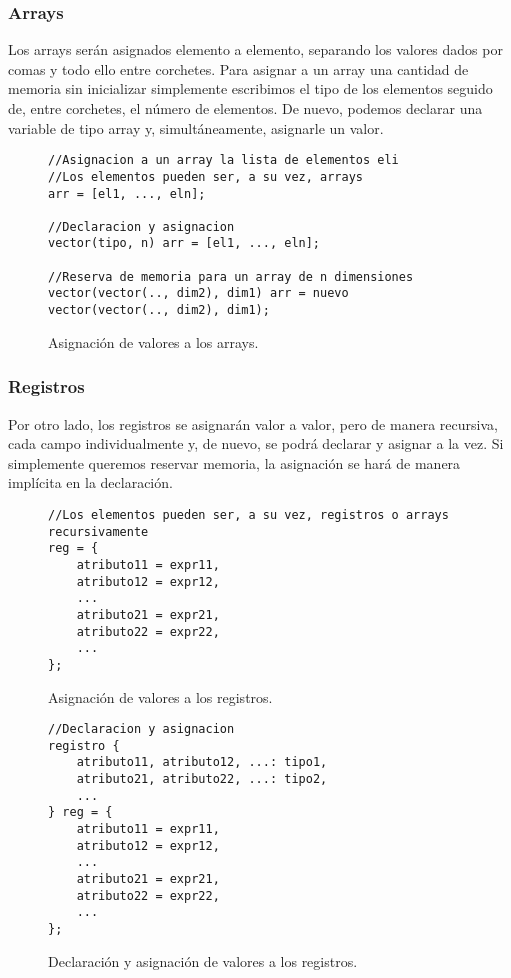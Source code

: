 \subsubsection{Arrays}
Los arrays serán asignados elemento a elemento, separando los valores dados por
comas y todo ello entre corchetes. Para asignar a un array una cantidad de
memoria sin inicializar simplemente escribimos el tipo de los elementos seguido
de, entre corchetes, el número de elementos. De nuevo, podemos declarar una
variable de tipo array y, simultáneamente, asignarle un valor.
\begin{figure}[htbp]
    \centering
    \begin{lstlisting}
//Asignacion a un array la lista de elementos eli
//Los elementos pueden ser, a su vez, arrays
arr = [el1, ..., eln];

//Declaracion y asignacion
vector(tipo, n) arr = [el1, ..., eln];

//Reserva de memoria para un array de n dimensiones
vector(vector(.., dim2), dim1) arr = nuevo vector(vector(.., dim2), dim1);
    \end{lstlisting}
    \caption{Asignación de valores a los arrays.}
\end{figure}

\subsubsection{Registros}
Por otro lado, los registros se asignarán valor a valor, pero de manera
recursiva, cada campo individualmente y, de nuevo, se podrá declarar y asignar a
la vez. Si simplemente queremos reservar memoria, la asignación se hará de
manera implícita en la declaración.
\begin{figure}[htbp]
    \centering
    \begin{lstlisting}
//Los elementos pueden ser, a su vez, registros o arrays recursivamente
reg = {
    atributo11 = expr11,
    atributo12 = expr12,
    ...
    atributo21 = expr21,
    atributo22 = expr22,
    ...
};
    \end{lstlisting}
    \caption{Asignación de valores a los registros.}
\end{figure}

\begin{figure}[htbp]
    \centering
    \begin{lstlisting}
//Declaracion y asignacion
registro {
    atributo11, atributo12, ...: tipo1,
    atributo21, atributo22, ...: tipo2,
    ...
} reg = {
    atributo11 = expr11,
    atributo12 = expr12,
    ...
    atributo21 = expr21,
    atributo22 = expr22,
    ...
};
    \end{lstlisting}
    \caption{Declaración y asignación de valores a los registros.}
\end{figure}

